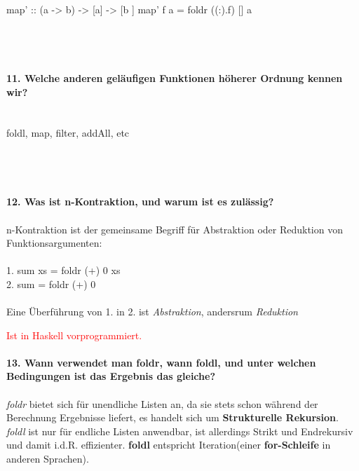 \documentclass{article}
\begin{document}
map' :: (a -> b) -> [a] -> [b
]
map' f a = foldr ((:).f) [] a
\\
\\
\\
\\
\\
\textbf{11. Welche anderen geläufigen Funktionen höherer Ordnung kennen wir?}
\\
\\
\\
foldl, map, filter, addAll, etc
\\
\\
\\
\\
\\
\textbf{12. Was ist n-Kontraktion, und warum ist es zulässig?}\\
\\
n-Kontraktion ist der gemeinsame Begriff für Abstraktion oder Reduktion von Funktionsargumenten:\\
\\
1. sum xs = foldr (+) 0 xs\\
2. sum = foldr (+) 0\\
\\
Eine Überführung von 1. in 2. ist \textit{Abstraktion}, andersrum \textit{Reduktion}

\textcolor{red}{Ist in Haskell vorprogrammiert.}
\\
\\
\textbf{13. Wann verwendet man foldr, wann foldl, und unter welchen Bedingungen ist das Ergebnis das gleiche?}\\
\\
\emph{foldr} bietet sich für unendliche Listen an, da sie stets schon w\"ahrend der Berechnung Ergebnisse liefert, es handelt sich um \textbf{Strukturelle Rekursion}. \emph{foldl} ist nur für endliche Listen anwendbar, ist allerdings Strikt und Endrekursiv und damit i.d.R. effizienter. \textbf{foldl} entspricht Iteration(einer \textbf{for-Schleife} in anderen Sprachen).
\end{document}
